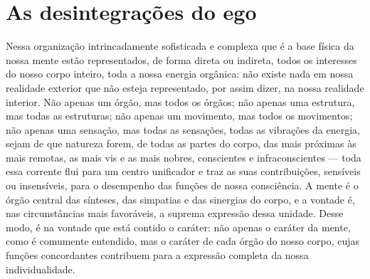 \chapter[As desintegrações do ego\\ \textit{Henry Maudsley}]{As desintegrações do ego}

Nessa organização intrincadamente sofisticada e complexa que é a base
física da nossa mente estão representados, de forma direta ou indireta,
todos os interesses do nosso corpo inteiro, toda a nossa energia
orgânica: não existe nada em nossa realidade exterior que não esteja
representado, por assim dizer, na nossa realidade interior.  Não apenas
um órgão, mas todos os órgãos; não apenas uma estrutura, mas todas as
estruturas; não apenas um movimento, mas todos os movimentos; não
apenas uma sensação, mas todas as sensações, todas as vibrações da
energia, sejam de que natureza forem, de todas as partes do corpo, das
mais próximas às mais remotas, as mais vis e as mais nobres,
conscientes e infraconscientes --- toda essa corrente flui para um centro
unificador e traz as suas contribuições, sensíveis ou insensíveis,
para o desempenho das funções de nossa consciência.  A mente é o órgão
central das sínteses, das simpatias e das sinergias do corpo, e a
vontade é, nas circunstâncias mais favoráveis, a suprema expressão
dessa unidade.  Desse modo, é na vontade que está contido o caráter:
não apenas o caráter da mente, como é comumente entendido, mas o
caráter de cada órgão do nosso corpo, cujas funções concordantes
contribuem para a expressão completa da nossa individualidade.

